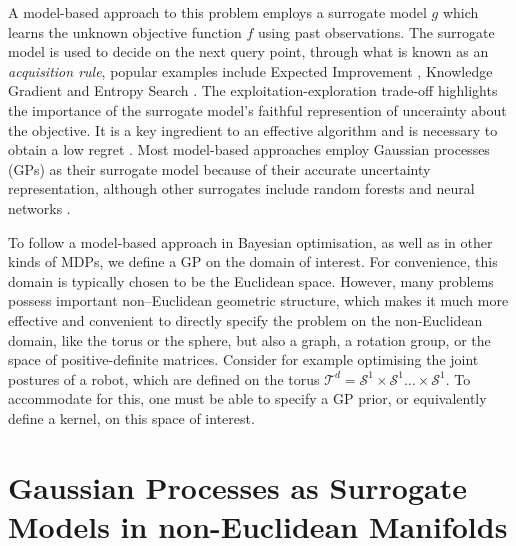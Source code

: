 A model-based approach to this problem employs a surrogate model $g$ which learns the unknown objective function $f$ using past observations. The surrogate model is used to decide on the next query point, through what is known as an \emph{acquisition rule},
popular examples include Expected Improvement \citep{jones1998efficient}, Knowledge Gradient \citep{frazier2009knowledge} and Entropy Search \citep{hennig2012entropy}. The exploitation-exploration trade-off highlights the importance of the surrogate model's faithful represention of uncerainty about the objective. It is a key ingredient to an effective algorithm and is necessary to obtain a low regret \citep{srinivas2009gaussian}. Most model-based approaches employ Gaussian processes (GPs) as their surrogate model because of their accurate uncertainty representation, although other surrogates include random forests \citep{hutter2014efficient} and neural networks \citep{snoek2015scalable}.

To follow a model-based approach in Bayesian optimisation, as well as in other kinds of MDPs, we define a GP on the domain of interest. For convenience, this domain is typically chosen to be the Euclidean space. However, many problems possess important non–Euclidean geometric structure, which makes it much more effective and convenient to directly specify the problem on the non-Euclidean domain, like the torus or the sphere, but also a graph, a rotation group, or the space of positive-definite matrices. Consider for example optimising the joint postures of a robot, which are defined on the torus $\mathcal{T}^d = \mathcal{S}^1 \times \mathcal{S}^1 \ldots \times \mathcal{S}^1$. To accommodate for this, one must be able to specify a GP prior, or equivalently define a kernel, on this space of interest.

\section{Gaussian Processes as Surrogate Models in non-Euclidean Manifolds}
\label{sec:gp-noneuclidean}

